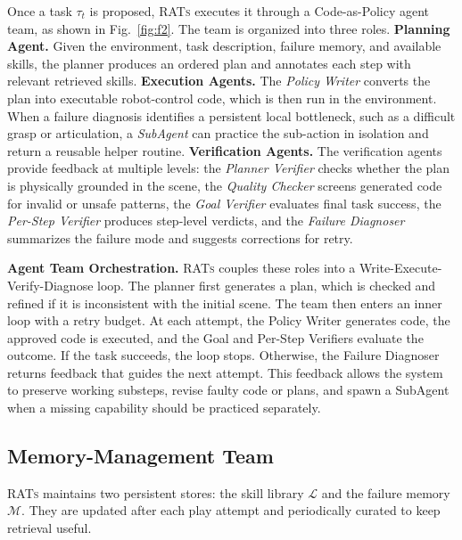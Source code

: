 Once a task $\tau_t$ is proposed, \textsc{RATs} executes it through a Code-as-Policy agent team, as shown in Fig.~\ref{fig:f2}. The team is organized into three roles. 
\textbf{Planning Agent.} Given the environment, task description, failure memory, and available skills, the planner produces an ordered plan and annotates each step with relevant retrieved skills. 
\textbf{Execution Agents.} The \textit{Policy Writer} converts the plan into executable robot-control code, which is then run in the environment. When a failure diagnosis identifies a persistent local bottleneck, such as a difficult grasp or articulation, a \textit{SubAgent} can practice the sub-action in isolation and return a reusable helper routine. 
\textbf{Verification Agents.} The verification agents provide feedback at multiple levels: the \textit{Planner Verifier} checks whether the plan is physically grounded in the scene, the \textit{Quality Checker} screens generated code for invalid or unsafe patterns, the \textit{Goal Verifier} evaluates final task success, the \textit{Per-Step Verifier} produces step-level verdicts, and the \textit{Failure Diagnoser} summarizes the failure mode and suggests corrections for retry.

\textbf{Agent Team Orchestration.}
\textsc{RATs} couples these roles into a Write-Execute-Verify-Diagnose loop. The planner first generates a plan, which is checked and refined if it is inconsistent with the initial scene. The team then enters an inner loop with a retry budget. At each attempt, the Policy Writer generates code, the approved code is executed, and the Goal and Per-Step Verifiers evaluate the outcome. If the task succeeds, the loop stops. Otherwise, the Failure Diagnoser returns feedback that guides the next attempt. This feedback allows the system to preserve working substeps, revise faulty code or plans, and spawn a SubAgent when a missing capability should be practiced separately.











\subsection{Memory-Management Team}
\label{sec:updates}

\textsc{RATs} maintains two persistent stores: the skill library $\mathcal{L}$ and the failure memory $\mathcal{M}$. They are updated after each play attempt and periodically curated to keep retrieval useful.

